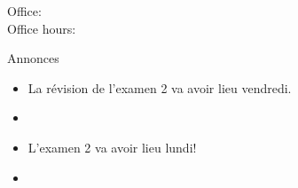 \documentclass{beamer}
\subtitle[Vêtements, \lexi{mettre} et adjectifs démonstratifs]{Les vêtements, le verbe \lexi{mettre} et les adjectifs démonstratifs}
\begin{document}
  \begin{frame}
    \titlepage
    \tiny{Office: \\
          Office hours: }
  \end{frame}

  \begin{frame}{Annonces}
    \begin{itemize}
      \item La révision de l'examen 2 va avoir lieu vendredi.
      \item[] 
      \item L'examen 2 va avoir lieu lundi!
      \item[] 
    \end{itemize}
  \end{frame}

\end{document}
